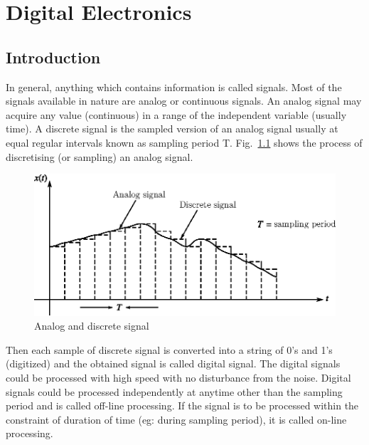 \makeatletter
\def\@makechapterhead#1{%
  \vspace*{10\p@}%
  {\parindent \z@ \raggedleft \normalfont
    \ifnum \c@secnumdepth >\m@ne
      \if@mainmatter
        \LARGE\bfseries \@chapapp\space \thechapter
	\vskip 4pt
        \hrule height 2pt
        \par\nobreak
        \vskip 5\p@
      \fi
    \fi
    \interlinepenalty\@M
    \huge \bfseries #1\par\nobreak
\vskip 5pt

\hrule height 2pt
 \vskip 10\p@  
  }}
\makeatother

\chapter{Digital Electronics}\label{chap5}

\section{Introduction}\label{sec5.1}

In general, anything which contains information is called signals. Most of the signals available in nature are analog or continuous signals. An analog signal may acquire any value (continuous) in a range of the independent variable (usually time). A discrete signal is the sampled version of an analog signal usually at equal regular intervals known as sampling period T. Fig.~\ref{fig5.1} shows the process of discretising (or sampling) an analog signal.
\begin{figure}[H]
\centering
\includegraphics{chap5/fig5.1.eps}
\caption{Analog and discrete signal}\label{fig5.1}
\end{figure}

Then each sample of discrete signal is converted into a string of 0's and 1's (digitized) and the obtained signal is called digital signal. The digital signals could be processed with high speed with no disturbance from the noise. Digital signals could be processed independently at anytime other than the sampling period and is called off-line processing. If the signal is to be processed within the constraint of duration of time (eg: during sampling period), it is called on-line processing.

